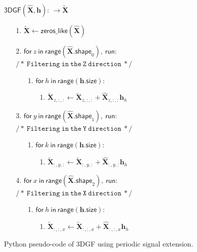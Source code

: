 \documentclass{article}
\begin{document}
\begin{figure}
\noindent $\mathsf{3DGF}(\hat{\mathbf{X}}, \mathbf{h})$: $\rightarrow\tilde{\mathbf{X}}$
\vspace{-1ex}
\begin{enumerate}
  \setlength{\itemsep}{0pt}
\item [1.] $\tilde{\mathbf{X}}\leftarrow\mathsf{zeros\_like}(\hat{\mathbf{X}})$
\item [2.] $\mathsf{for}~z~\mathsf{in}~\mathsf{range}(\hat{\textbf{X}}.\mathsf{shape}_0),~\mathsf{run}$:  \hfill $\mathtt{/*~Filtering~in~the~Z~direction~*/}$
  \begin{enumerate}
  \item [1.] $\mathsf{for}~h~\mathsf{in~range}(\mathbf{h}.\mathsf{size})$:
    \begin{enumerate}
    \item [1.] $\tilde{\mathbf{X}}_{z,:,:}\leftarrow\tilde{\mathbf{X}}_{z,:,:}+\hat{\mathbf{X}}_{z,:,:}\mathbf{h}_{h}$
    \end{enumerate}
  \end{enumerate}
\item [3.] $\mathsf{for}~y~\mathsf{in}~\mathsf{range}(\hat{\textbf{X}}.\mathsf{shape}_1),~\mathsf{run}$:  \hfill $\mathtt{/*~Filtering~in~the~Y~direction~*/}$
  \begin{enumerate}
  \item [1.] $\mathsf{for}~k~\mathsf{in~range}(\mathbf{h}.\mathsf{size})$:
    \begin{enumerate}
    \item [1.] $\tilde{\mathbf{X}}_{:,y,:}\leftarrow\tilde{\mathbf{X}}_{:,y,:}+\hat{\mathbf{X}}_{:,y,:}\mathbf{h}_{h}$
    \end{enumerate}
  \end{enumerate}
\item [4.] $\mathsf{for}~x~\mathsf{in}~\mathsf{range}(\hat{\textbf{X}}.\mathsf{shape}_2),~\mathsf{run}$:  \hfill $\mathtt{/*~Filtering~in~the~X~direction~*/}$
  \begin{enumerate}
  \item [1.] $\mathsf{for}~h~\mathsf{in~range}(\mathbf{h}.\mathsf{size})$:
    \begin{enumerate}
    \item [1.] $\tilde{\mathbf{X}}_{:,:,x}\leftarrow\tilde{\mathbf{X}}_{:,:,x}+\hat{\mathbf{X}}_{:,:,x}\mathbf{h}_{h}$
    \end{enumerate}
  \end{enumerate}
\end{enumerate}
\caption{Python pseudo-code of 3DGF using periodic signal extension.}
\label{fig:3DGF_imple}
\end{figure}
\end{document}

